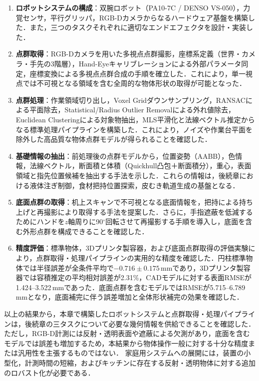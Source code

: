 \begin{enumerate}
  \item \textbf{ロボットシステムの構成}：双腕ロボット（PA10-7C / DENSO VS-050），力覚センサ，平行グリッパ，RGB-Dカメラからなるハードウェア基盤を構築した．また，三つのタスクそれぞれに適切なエンドエフェクタを設計・実装した．

  \item \textbf{点群取得}：RGB-Dカメラを用いた多視点点群撮影，座標系定義（世界・カメラ・手先の3階層），Hand-Eyeキャリブレーションによる外部パラメータ同定，座標変換による多視点点群合成の手順を確立した．これにより，単一視点では不可視となる領域を含む全周的な物体形状の取得が可能となった．

  \item \textbf{点群処理}：作業領域切り出し，Voxel Gridダウンサンプリング，RANSACによる平面除去，Statistical/Radius Outlier Removalによる外れ値除去，Euclidean Clusteringによる対象物抽出，MLS平滑化と法線ベクトル推定からなる標準処理パイプラインを構築した．これにより，ノイズや作業台平面を除外した高品質な物体点群モデルが得られることを確認した．

  \item \textbf{基礎情報の抽出}：前処理後の点群モデルから，位置姿勢（AABB），色情報，法線ベクトル，断面積と体積（Quickhull凸包＋断面積分），重心，表面領域と指先位置候補を抽出する手法を示した．これらの情報は，後続章における液体注ぎ制御，食材把持位置探索，皮むき軌道生成の基盤となる．

  \item \textbf{底面点群の取得}：机上スキャンで不可視となる底面情報を，把持による持ち上げと再撮影により取得する手法を提案した．さらに，手指遮蔽を低減するためにハンドを$z$軸周りに90$^{\circ}$回転させて再撮影する手順を導入し，底面を含む外形点群を構成できることを確認した．

  \item \textbf{精度評価}：標準物体，3Dプリンタ製容器，および底面点群取得の評価実験により，点群取得・処理パイプラインの実用的な精度を確認した．円柱標準物体では半径誤差が全条件平均で$-0.716\pm0.175$\,mmであり，3Dプリンタ製容器では容積推定の平均相対誤差が2.31\%，CADモデルに対する表面RMSEが1.424--3.522\,mmであった．底面点群を含むモデルではRMSEが5.715--6.789\,mmとなり，底面補完に伴う誤差増加と全体形状補完の効果を確認した．
\end{enumerate}

\begin{revisionblock}
以上の結果から，本章で構築したロボットシステムと点群取得・処理パイプラインは，後続章の三タスクについて必要な幾何情報を供給できることを確認した．
ただし，RGB-D計測には反射・透明表面や遮蔽による欠測があり，底面を含むモデルでは誤差も増加するため，本結果から物体操作一般に対する十分な精度または汎用性を主張するものではない．
家庭用システムへの展開には，装置の小型化，計測時間の短縮，およびキッチンに存在する反射・透明物体に対する追加のロバスト化が必要である．
\end{revisionblock}
